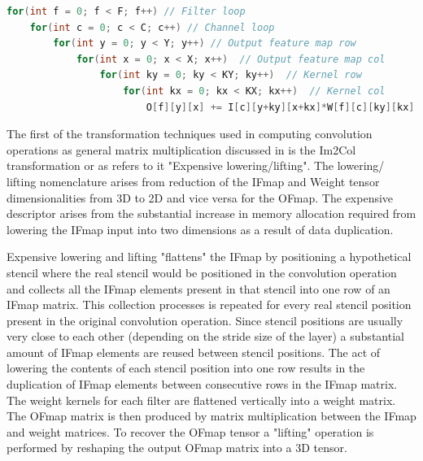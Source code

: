 \begin{minipage}{\linewidth}
    \begin{lstlisting}[language=C, caption=Convolution implemented as nested loops, label={lst:conv_loop}]
for(int f = 0; f < F; f++) // Filter loop
    for(int c = 0; c < C; c++) // Channel loop
        for(int y = 0; y < Y; y++) // Output feature map row
            for(int x = 0; x < X; x++)  // Output feature map col
                for(int ky = 0; ky < KY; ky++)  // Kernel row
                    for(int kx = 0; kx < KX; kx++)  // Kernel col
                        O[f][y][x] += I[c][y+ky][x+kx]*W[f][c][ky][kx];
    \end{lstlisting}
\end{minipage}

The first of the transformation techniques used in computing convolution
operations as general matrix multiplication discussed in \cite{cafe_con_troll}
is the Im2Col transformation or as \cite{cafe_con_troll} refers to it
"Expensive lowering/lifting". The lowering/ lifting nomenclature arises from
reduction of the IFmap and Weight tensor dimensionalities from 3D to 2D and vice
versa for the OFmap. The expensive descriptor arises from the substantial
increase in memory allocation required from lowering the IFmap input into two
dimensions as a result of data duplication. 

Expensive lowering and lifting "flattens" the IFmap by positioning a
hypothetical stencil where the real stencil would be positioned in the
convolution operation and collects all the IFmap elements present in that
stencil into one row of an IFmap matrix. This collection processes is repeated
for every real stencil position present in the original convolution operation.
Since stencil positions are usually very close to each other (depending on the
stride size of the layer) a substantial amount of IFmap elements are reused
between stencil positions. The act of lowering the contents of each stencil
position into one row results in the duplication of IFmap elements between
consecutive rows in the IFmap matrix.  
The weight kernels for each filter are flattened vertically into a weight
matrix. The OFmap matrix is then produced by matrix multiplication between the
IFmap and weight matrices. To recover the OFmap tensor a "lifting" operation is
performed by reshaping the output OFmap matrix into a 3D tensor.  


